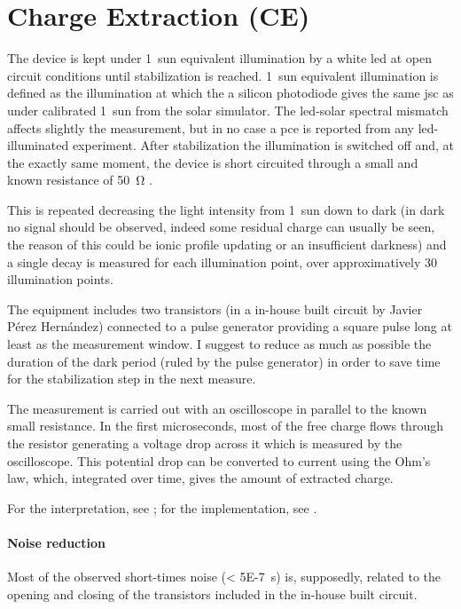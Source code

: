 \section{Charge Extraction (CE)}

The device is kept under 1~sun equivalent illumination by a white \gls{led} at open circuit conditions until stabilization is reached. 1~sun equivalent illumination is defined as the illumination at which the a silicon photodiode gives the same \gls{jsc} as under calibrated 1~sun from the solar simulator. The \gls{led}-solar spectral mismatch affects slightly the measurement, but in no case a \gls{pce} is reported from any \gls{led}-illuminated experiment. After stabilization the illumination is switched off and, at the exactly same moment, the device is short circuited through a small and known resistance of \SI{50}{\ohm} \cite{Duffy2000}.

This is repeated decreasing the light intensity from 1~sun down to dark (in dark no signal should be observed, indeed some residual charge can usually be seen, the reason of this could be ionic profile updating or an insufficient darkness) and a single decay is measured for each illumination point, over approximatively 30 illumination points.

The equipment includes two transistors (in a in-house built circuit by Javier Pérez Hernández) connected to a pulse generator providing a square pulse long at least as the measurement window. I suggest to reduce as much as possible the duration of the dark period (ruled by the pulse generator) in order to save time for the stabilization step in the next measure.

The measurement is carried out with an oscilloscope in parallel to the known small resistance. In the first microseconds, most of the free charge flows through the resistor generating a voltage drop across it which is measured by the oscilloscope. This potential drop can be converted to current using the Ohm's law, which, integrated over time, gives the amount of extracted charge.

For the interpretation, see ; for the implementation, see .

\paragraph{Noise reduction}\label{r_ce_noise}
Most of the observed short-times noise (\SI{< 5E-7}{\s}) is, supposedly, related to the opening and closing of the transistors included in the in-house built circuit.

